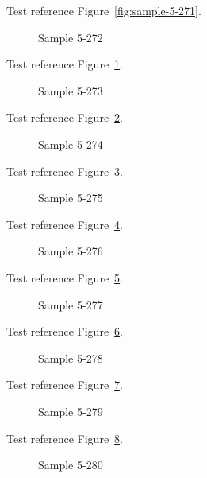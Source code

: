 Test reference Figure~\ref{fig:sample-5-271}.

\begin{figure}[tbhp]
\caption{Sample 5-272}
\label{fig:sample-5-272}
\end{figure}

Test reference Figure~\ref{fig:sample-5-272}.

\begin{figure}[tbhp]
\caption{Sample 5-273}
\label{fig:sample-5-273}
\end{figure}

Test reference Figure~\ref{fig:sample-5-273}.

\begin{figure}[tbhp]
\caption{Sample 5-274}
\label{fig:sample-5-274}
\end{figure}

Test reference Figure~\ref{fig:sample-5-274}.

\begin{figure}[tbhp]
\caption{Sample 5-275}
\label{fig:sample-5-275}
\end{figure}

Test reference Figure~\ref{fig:sample-5-275}.

\begin{figure}[tbhp]
\caption{Sample 5-276}
\label{fig:sample-5-276}
\end{figure}

Test reference Figure~\ref{fig:sample-5-276}.

\begin{figure}[tbhp]
\caption{Sample 5-277}
\label{fig:sample-5-277}
\end{figure}

Test reference Figure~\ref{fig:sample-5-277}.

\begin{figure}[tbhp]
\caption{Sample 5-278}
\label{fig:sample-5-278}
\end{figure}

Test reference Figure~\ref{fig:sample-5-278}.

\begin{figure}[tbhp]
\caption{Sample 5-279}
\label{fig:sample-5-279}
\end{figure}

Test reference Figure~\ref{fig:sample-5-279}.

\begin{figure}[tbhp]
\caption{Sample 5-280}
\label{fig:sample-5-280}
\end{figure}

